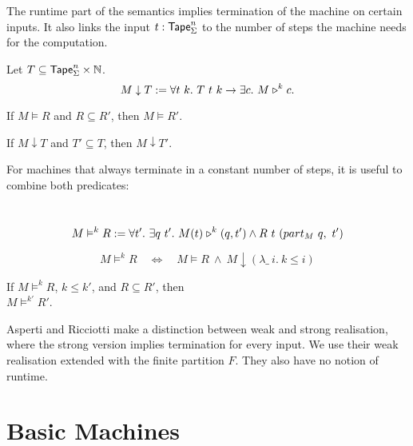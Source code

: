 The runtime part of the semantics implies termination of the machine on certain inputs.  It also links the input $t:\textsf{Tape}_\Sigma^n$ to the number of
steps the machine needs for the computation.

\begin{definition}
  \label{def:TerminatesIn}
  Let $T \subseteq \textsf{Tape}_\Sigma^n \times \mathbb{N}$.
  \[
    M \downarrow T :=
    \forall t~k.~T~t~k \rightarrow
    \exists c.~M \mathrel{\triangleright}^k c.
  \]
\end{definition}


\begin{lemma}
  \label{lem:Realise_monotone}
  If $M \vDash R$ and $R \subseteq R'$, then $M \vDash R'$.
\end{lemma}

\begin{lemma}
  \label{lem:TerminatesIn_monotone}
  If $M \downarrow T$ and $T' \subseteq T$, then $M \downarrow T'$.
\end{lemma}

For machines that always terminate in a constant number of steps, it is useful to combine both predicates:
\begin{definition}
  \label{def:RealiseIn}
  ~
  \[
    M \vDash^k R :=
    \forall t'.~
    \exists q~t'.~
    M(t) \mathrel{\triangleright}^k(q, t') \land R~t~(part_M~q,~t')
  \]
\end{definition}

\begin{lemma}
  \label{lem:Realise_total}
  \[
    M \vDash^k R
    \quad\iff\quad
    M \vDash R ~\land~
    M \downarrow (\lambda \_~i.~k \le i)
  \]
\end{lemma}

\begin{lemma}
  \label{lem:RealiseIn_monotone}
  If $M \vDash^k R$, $k \leq k'$, and $R \subseteq R'$, then \\
  $M \vDash^{k'} R'$.
\end{lemma}

Asperti and Ricciotti \cite{asperti2015} make a distinction between weak and strong realisation, where the strong version implies termination for
every input.  We use their weak realisation extended with the finite partition $F$.  They also have no notion of runtime.


\section{Basic Machines}
\label{sec:basic_machines}



